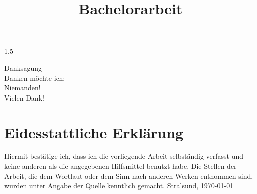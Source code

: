 \documentclass[12pt,a4paper,titlepage,oneside]{report} %
\title{Bachelorarbeit}
\author{}
\date{}
\begin{document}
\newpage %
\fancyhf{} %
\begin{spacing}{1.5} %
\begin{center} %
    \LARGE Danksagung
    \\[3em]
    \large Danken möchte ich:
    \\[3em]
    Niemanden!
    \\[3em]
    Vielen Dank!
\end{center} %
\newpage
\fancyhead[L]{\nouppercase\leftmark} %
\fancyhead[R]{\thepage} %
\tableofcontents %
\newpage
{} %
\listoffigures %
\newpage





\printbibliography[heading=bibintoc,title=Literaturverzeichnis] %

\newpage
\chapter*{Eidesstattliche Erklärung} %
Hiermit bestätige ich, dass ich die vorliegende Arbeit selbständig verfasst und keine anderen als die angegebenen Hilfsmittel benutzt habe. Die Stellen der Arbeit, die dem Wortlaut oder dem Sinn nach anderen Werken entnommen sind, wurden unter Angabe der Quelle kenntlich gemacht.
Stralsund, \today
\fancyhf{} %
\fancyhead[R]{\thepage} %

\clearpage %
\end{spacing} %

\end{document}
